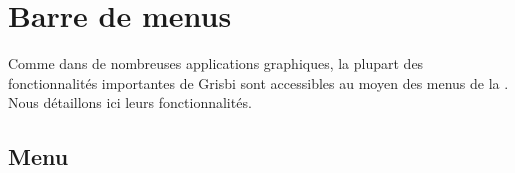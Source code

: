 
\section{Barre de menus\label{home-menus}}


Comme dans de nombreuses applications graphiques, la plupart des fonctionnalités importantes de Grisbi sont accessibles au moyen des menus de la . Nous détaillons ici leurs fonctionnalités.


\subsection{Menu \label{home-menus-file}}

